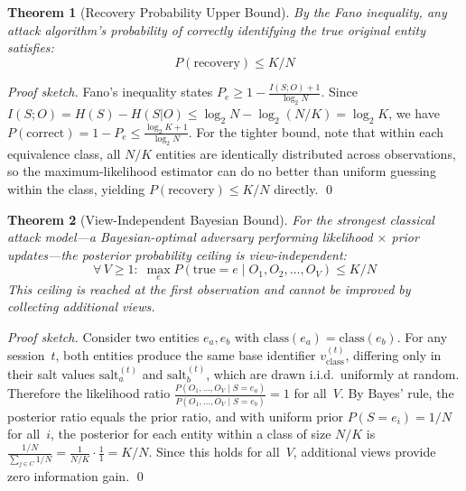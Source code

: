 \documentclass[11pt]{article}
\newtheorem{theorem}{Theorem}
\begin{document}
\begin{theorem}[Recovery Probability Upper Bound]
By the Fano inequality, any attack algorithm's probability of correctly identifying the true original entity satisfies:
\begin{equation}
P(\text{recovery}) \leq K/N
\end{equation}
\end{theorem}

\begin{proof}[Proof sketch]
Fano's inequality states $P_e \geq 1 - \frac{I(S;O)+1}{\log_2 N}$. Since $I(S;O) = H(S) - H(S|O) \leq \log_2 N - \log_2(N/K) = \log_2 K$, we have $P(\text{correct}) = 1 - P_e \leq \frac{\log_2 K + 1}{\log_2 N}$. For the tighter bound, note that within each equivalence class, all $N/K$ entities are identically distributed across observations, so the maximum-likelihood estimator can do no better than uniform guessing within the class, yielding $P(\text{recovery}) \leq K/N$ directly. \qed
\end{proof}

\begin{theorem}[View-Independent Bayesian Bound]
For the strongest classical attack model---a Bayesian-optimal adversary performing likelihood $\times$ prior updates---the posterior probability ceiling is view-independent:
\begin{equation}
\forall\, V \geq 1 :\; \max_{e} P(\text{true} = e \mid O_1, O_2, \ldots, O_V) \leq K/N
\end{equation}
This ceiling is reached at the first observation and cannot be improved by collecting additional views.
\end{theorem}

\begin{proof}[Proof sketch]
Consider two entities $e_a, e_b$ with $\text{class}(e_a) = \text{class}(e_b)$. For any session~$t$, both entities produce the same base identifier $v^{(t)}_{\text{class}}$, differing only in their salt values $\text{salt}^{(t)}_a$ and $\text{salt}^{(t)}_b$, which are drawn i.i.d.\ uniformly at random. Therefore the likelihood ratio $\frac{P(O_1,\ldots,O_V \mid S=e_a)}{P(O_1,\ldots,O_V \mid S=e_b)} = 1$ for all~$V$. By Bayes' rule, the posterior ratio equals the prior ratio, and with uniform prior $P(S = e_i) = 1/N$ for all~$i$, the posterior for each entity within a class of size $N/K$ is $\frac{1/N}{\sum_{j \in C} 1/N} = \frac{1}{N/K} \cdot \frac{1}{1} = K/N$. Since this holds for all~$V$, additional views provide zero information gain. \qed
\end{proof}
\end{document}
